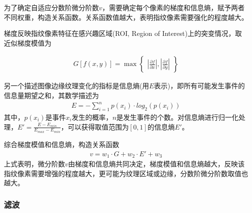 \documentclass{whutmod}
\begin{document}
		为了确定自适应分数阶微分阶数$v$，需要确定每个像素的梯度和信息熵，赋予两者不同权重，构造关系函数。关系函数值越大，表明指纹像素需要强化的程度越大。
		
		梯度反映指纹像素特征在感兴趣区域(ROI, Region of Interest)上的突变情况，取近似梯度模值为
		
		\begin{gather}
		\displaystyle G[f(x,y)]=\max\begin{Bmatrix}
			|\frac{\partial f }{\partial x}|,|\frac{\partial f}{\partial y}|
		\end{Bmatrix}
		\end{gather}
		
		另一个描述图像边缘纹理变化的指标是信息熵(用$E$表示)，即所有可能发生事件的信息量期望之和，其数学描述为
		\begin{gather}
		E=-\sum_{i=1}^{n}p(x_i)\cdot log_2(p(x_i))	
		\end{gather}
		其中，$p(x_i)$是事件$x_i$发生的概率，$n$是发生事件的个数。对信息熵进行归一化处理，$\displaystyle E'=\frac{E-E_{min}}{E_{max}-E_{min}}$，可以获得取值范围为$[0,1]$的信息熵$E'$。
		
		综合梯度模值和信息熵，构造关系函数
		\begin{gather}
		v=w_1\cdot G+w_2\cdot E'+w_3
		\end{gather}
		上式表明，微分阶数$v$由梯度和信息熵共同决定，梯度模值和信息熵越大，反映该指纹像素需要增强的程度越大，更可能为纹理区域或边缘，分数阶微分阶数取值也越大。
		
		\subsubsection{滤波}
		
		
\end{document}
